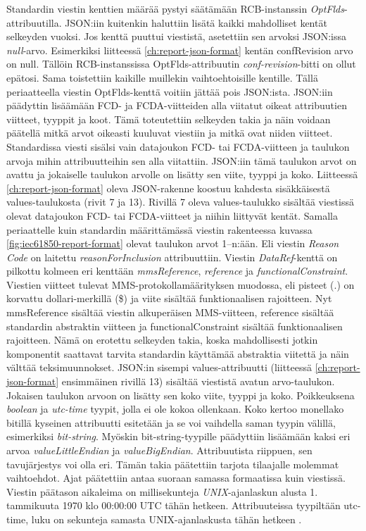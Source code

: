 Standardin viestin kenttien määrää pystyi säätämään RCB-instanssin \emph{OptFlds}-attribuutilla. JSON:iin kuitenkin haluttiin lisätä kaikki mahdolliset kentät selkeyden vuoksi. Jos kenttä puuttui viestistä, asetettiin sen arvoksi JSON:issa \emph{null}-arvo. Esimerkiksi liitteessä \ref{ch:report-json-format} kentän confRevision arvo on null. Tällöin RCB-instanssissa OptFlds-attribuutin \emph{conf-revision}-bitti on ollut epätosi. Sama toistettiin kaikille muillekin vaihtoehtoisille kentille. Tällä periaatteella viestin OptFlds-kenttä voitiin jättää pois JSON:ista. JSON:iin päädyttin lisäämään FCD- ja FCDA-viitteiden alla viitatut oikeat attribuutien viitteet, tyyppit ja koot. Tämä toteutettiin selkeyden takia ja näin voidaan päätellä mitkä arvot oikeasti kuuluvat viestiin ja mitkä ovat niiden viitteet. Standardissa viesti sisälsi vain datajoukon FCD- tai FCDA-viitteen ja taulukon arvoja mihin attribuutteihin sen alla viitattiin. JSON:iin tämä taulukon arvot on avattu ja jokaiselle taulukon arvolle on lisätty sen viite, tyyppi ja koko. Liitteessä \ref{ch:report-json-format} oleva JSON-rakenne koostuu kahdesta sisäkkäisestä values-taulukosta (rivit 7 ja 13). Rivillä 7 oleva values-taulukko sisältää viestissä olevat datajoukon FCD- tai FCDA-viitteet ja niihin liittyvät kentät. Samalla periaattelle kuin standardin määrittämässä viestin rakenteessa kuvassa \ref{fig:iec61850-report-format} olevat taulukon arvot 1--n:ään. Eli viestin \emph{Reason Code} on laitettu \emph{reasonForInclusion} attribuuttiin. Viestin \emph{DataRef}-kenttä on pilkottu kolmeen eri kenttään \emph{mmsReference}, \emph{reference} ja \emph{functionalConstraint}. Viestien viitteet tulevat MMS-protokollamäärityksen muodossa, eli pisteet (.) on korvattu dollari-merkillä (\$) ja viite sisältää funktionaalisen rajoitteen. Nyt mmsReference sisältää viestin alkuperäisen MMS-viitteen, reference sisältää standardin abstraktin viitteen ja functionalConstraint sisältää funktionaalisen rajoitteen. Nämä on erotettu selkeyden takia, koska mahdollisesti jotkin komponentit saattavat tarvita standardin käyttämää abstraktia viitettä ja näin välttää teksimuunnokset. JSON:in sisempi values-attribuutti (liitteessä \ref{ch:report-json-format} ensimmäinen rivillä 13) sisältää viestistä avatun arvo-taulukon. Jokaisen taulukon arvoon on lisätty sen koko viite, tyyppi ja koko. Poikkeuksena \emph{boolean} ja \emph{utc-time} tyypit, jolla ei ole kokoa ollenkaan. Koko kertoo monellako bitillä kyseinen attribuutti esitetään ja se voi vaihdella saman tyypin välillä, esimerkiksi \emph{bit-string}. Myöskin bit-string-tyypille päädyttiin lisäämään kaksi eri arvoa \emph{valueLittleEndian} ja \emph{valueBigEndian}. Attribuutista riippuen, sen tavujärjestys voi olla eri. Tämän takia päätettiin tarjota tilaajalle molemmat vaihtoehdot. Ajat päätettiin antaa suoraan samassa formaatissa kuin viestissä. Viestin päätason aikaleima on millisekunteja \emph{UNIX}-ajanlaskun alusta 1. tammikuuta 1970 klo 00:00:00 UTC tähän hetkeen. Attribuuteissa tyypiltään utc-time, luku on sekunteja samasta UNIX-ajanlaskusta tähän hetkeen \mbox{\cite[s.~26--27]{IEC61850-7-2}}.

